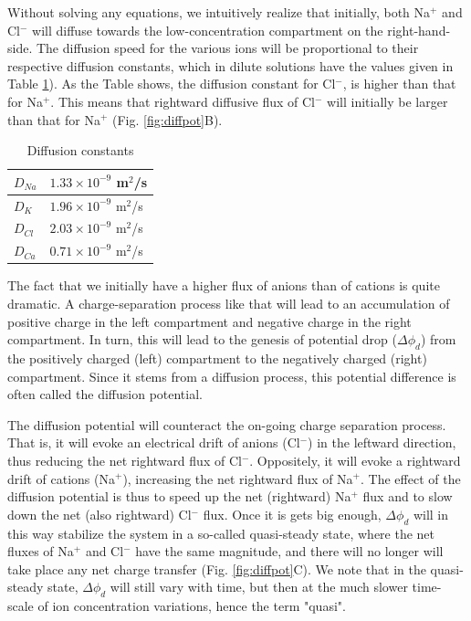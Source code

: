 Without solving any equations, we intuitively realize that initially, both Na$^+$ and Cl$^-$ will diffuse towards the low-concentration compartment on the right-hand-side. The diffusion speed for the various ions will be proportional to their respective diffusion constants, which in dilute solutions have the values given in Table \ref{tab:diffconsts}). As the Table shows, the diffusion constant for Cl$^-$, is higher than that for Na$^+$. This means that rightward diffusive flux of Cl$^-$ will initially be larger than that for Na$^+$  (Fig. \ref{fig:diffpot}B). 

\begin{table}[h!]
\begin{center}
\caption{Diffusion constants}
\label{tab:diffconsts}
    \begin{tabular}{l|l}
    \hline
    $D_{Na}$ & $1.33\times 10^{-9}$ m$^2$/s\\ \hline
    $D_K$ & $1.96  \times 10^{-9}$ m$^2$/s \\ \hline
    $D_{Cl}$ & $2.03 \times 10^{-9}$ m$^2$/s \\ \hline
    $D_{Ca}$ & $0.71\times 10^{-9}$ m$^2$/s \\ \hline
    \end{tabular}
\end{center}
\end{table}

The fact that we initially have a higher flux of anions than of cations is quite dramatic. A charge-separation process like that will lead to an accumulation of positive charge in the left compartment and negative charge in the right compartment. In turn, this will lead to the genesis of potential drop ($\Delta \phi_d$) from the positively charged (left) compartment to the negatively charged (right) compartment. Since it stems from a diffusion process, this potential difference is often called the diffusion potential. 

The diffusion potential will counteract the on-going charge separation process. That is, it will evoke an electrical drift of anions (Cl$^-$) in the leftward direction, thus reducing the net rightward flux of Cl$^-$. Oppositely, it will evoke a rightward drift of cations (Na$^+$), increasing the net rightward flux of Na$^+$. The effect of the diffusion potential is thus to speed up the net (rightward) Na$^+$ flux and to slow down the net (also rightward) Cl$^-$ flux. Once it is gets big enough, $\Delta \phi_d$ will in this way stabilize the system in a so-called quasi-steady state, where the net fluxes of Na$^+$ and Cl$^-$ have the same magnitude, and there will no longer will take place any net charge transfer (Fig. \ref{fig:diffpot}C). We note that in the quasi-steady state, $\Delta \phi_d$ will still vary with time, but then at the much slower time-scale of ion concentration variations, hence the term "quasi".

